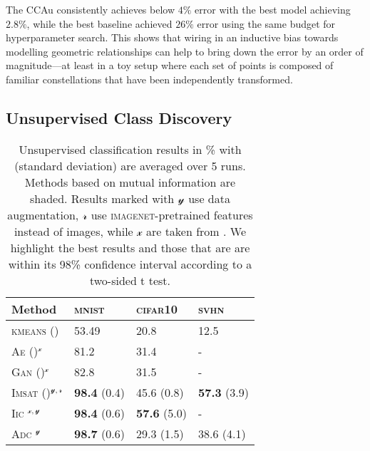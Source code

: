The \gls{CCAu} consistently achieves below $4\%$ error with the best model achieving $2.8\%$, while the best baseline achieved $26\%$ error using the same budget for hyperparameter search.
This shows that wiring in an inductive bias towards modelling geometric relationships can help to bring down the error by an order of magnitude—at least in a toy setup where each set of points is composed of familiar constellations that have been independently transformed.

\subsection{Unsupervised Class Discovery}
\label{sec:cls_experiments}

\begin{table}
\centering
\begin{minipage}[c]{.28\linewidth}
    \centering
    \caption{
        Unsupervised classification results in \% with (standard deviation) are averaged over 5 runs. Methods based on mutual information are shaded. Results marked with $\mathcal{y}$ use data augmentation, ${\mathcal{r}}$ use \textsc{imagenet}-pretrained features instead of images, while ${\mathcal{x}}$ are taken from \cite{Ji2018iic}. We highlight the best results and those that are are within its 98\% confidence interval according to a two-sided t test.
    }
    \label{tab:results}
\end{minipage}
\hfill
\begin{minipage}[c]{.7\linewidth}
    \centering
    \small
    \begin{tabular}{@{}llll@{}}
        Method & \textsc{mnist} & \textsc{cifar10} & \textsc{svhn} \\
        \midrule
        \textsc{kmeans} (\cite{Haeusser2018adc}) & 53.49 & 20.8 & 12.5 \\
        \textsc{Ae} (\cite{Bengio2007greedy})$^{\mathcal{x}}$ & 81.2 & 31.4 & - \\
        \textsc{Gan} (\cite{Radford2016gan})$^{\mathcal{x}}$ & 82.8 & 31.5 & - \\
        \rowcolor[HTML]{EFEFEF} 
        \textsc{Imsat} (\cite{Hu2017imsat})$^{\mathcal{y}, \mathcal{r}}$ & \textbf{98.4} (0.4) & 45.6 (0.8) & \textbf{57.3} (3.9) \\ 
        \rowcolor[HTML]{EFEFEF} 
        \textsc{Iic} \citep{Ji2018iic}$^{\mathcal{x}, \mathcal{y}}$ & \textbf{98.4} (0.6) & \textbf{57.6} (5.0) & - \\
        \rowcolor[HTML]{EFEFEF} 
        \textsc{Adc} \citep{Haeusser2018adc}$^\mathcal{y}$ & \textbf{98.7} (0.6) & 29.3 (1.5) & 38.6 (4.1) \\

\end{tabular}
\end{minipage}
\end{table}
